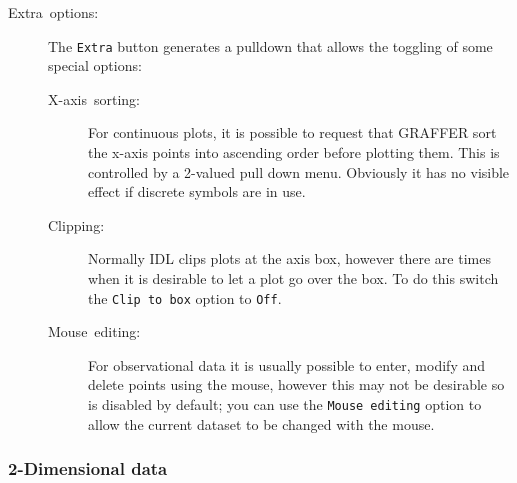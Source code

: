 \documentclass[11pt,twoside,english]{article}
\begin{document}
\begin{description}
\item [Extra~options:]The \texttt{Extra} button generates a pulldown
  that allows the toggling of some special options:

  \begin{description}
  \item [X-axis~sorting:]For continuous plots, it is possible to
    request that GRAFFER sort the x-axis points into ascending order
    before plotting them. This is controlled by a 2-valued pull down
    menu. Obviously it has no visible effect if discrete symbols are in
    use.
  \item [Clipping:]Normally IDL clips plots at the axis box, however
    there are times when it is desirable to let a plot go over the
    box. To do this switch the \texttt{Clip to box} option to
    \texttt{Off}.
  \item [Mouse~editing:]For observational data it is usually possible
    to enter, modify and delete points using the mouse, however this
    may not be desirable so is disabled by default; you can use the
    \texttt{Mouse editing} option to allow the current dataset to be
    changed with the mouse.
  \end{description}
\end{description}

\subsubsection{2-Dimensional data}
\end{document}
